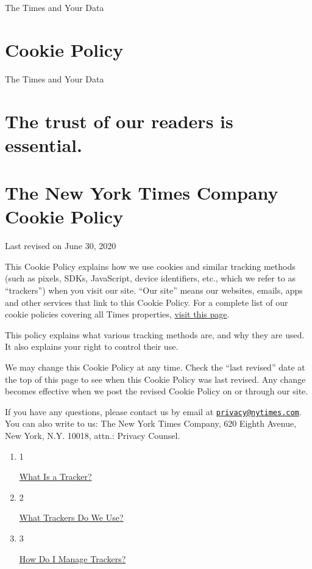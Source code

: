 The Times and Your Data

\hypertarget{cookie-policy}{%
\section{Cookie Policy}\label{cookie-policy}}

The Times and Your Data

\hypertarget{the-trust-of-our-readers-is-essential}{%
\section{The trust of our readers is
essential.}\label{the-trust-of-our-readers-is-essential}}

\hypertarget{the-new-york-times-company-cookie-policy}{%
\section{The New York Times Company Cookie
Policy}\label{the-new-york-times-company-cookie-policy}}

Last revised on June 30, 2020

This Cookie Policy explains how we use cookies and similar tracking
methods (such as pixels, SDKs, JavaScript, device identifiers, etc.,
which we refer to as ``trackers'') when you visit our site. ``Our site''
means our websites, emails, apps and other services that link to this
Cookie Policy. For a complete list of our cookie policies covering all
Times properties,
\href{https://www.nytimes.com/subscription/dg-cookie-policy/cookie-policy.html}{visit
this page}.

This policy explains what various tracking methods are, and why they are
used. It also explains your right to control their use.

We may change this Cookie Policy at any time. Check the ``last revised''
date at the top of this page to see when this Cookie Policy was last
revised. Any change becomes effective when we post the revised Cookie
Policy on or through our site.

If you have any questions, please contact us by email at
\href{mailto:privacy@nytimes.com}{\nolinkurl{privacy@nytimes.com}}. You
can also write to us: The New York Times Company, 620 Eighth Avenue, New
York, N.Y. 10018, attn.: Privacy Counsel.

\begin{enumerate}
\def\labelenumi{\arabic{enumi}.}
\item
  1

  \href{what-is-a-tracker}{What Is a Tracker?}
\item
  2

  \href{what-trackers-do-we-use}{What Trackers Do We Use?}
\item
  3

  \href{how-do-i-manage-trackers}{How Do I Manage Trackers?}
\end{enumerate}

